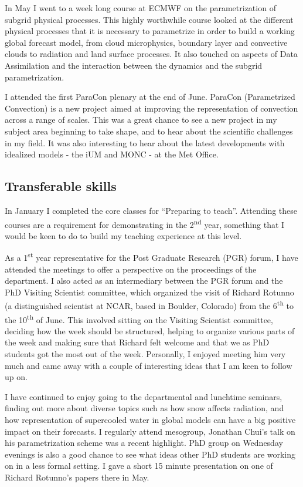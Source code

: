 \documentclass[11pt,a4paper]{article}
\newcommand{\ts}{\textsuperscript}
\begin{document}
In May I went to a week long course at ECMWF on the parametrization of subgrid physical processes.
This highly worthwhile course looked at the different physical processes that it is necessary to
parametrize in order to build a working global forecast model, from cloud microphysics, boundary
layer and convective clouds to radiation and land surface processes. It also touched on aspects of
Data Assimilation and the interaction between the dynamics and the subgrid parametrization.

I attended the first ParaCon plenary at the end of June. ParaCon (Parametrized Convection) is a new
project aimed at improving the representation of convection across a range of scales. This was a
great chance to see a new project in my subject area beginning to take shape, and to hear about the
scientific challenges in my field. It was also interesting to hear about the latest developments
with idealized models - the iUM and MONC - at the Met Office.

\label{sec:Training record}
\subsection{Transferable skills}
In January I completed the core classes for ``Preparing to teach''. Attending these courses are a
requirement for demonstrating in the 2\ts{nd} year, something that I would be keen to do to 
build my teaching experience at this level.

As a 1\ts{st} year representative for the Post Graduate Research (PGR) forum, I have attended the
meetings to offer a perspective on the proceedings of the department. I also acted as an
intermediary between the PGR forum and the PhD Visiting Scientist committee, which organized the
visit of Richard Rotunno (a distinguished scientist at NCAR, based in Boulder, Colorado) from the
6\ts{th} to the 10\ts{th} of June. This involved sitting on the Visiting Scientist committee,
deciding how the week should be structured, helping to organize various parts of the week and making
sure that Richard felt welcome and that we as PhD students got the most out of the week. Personally,
I enjoyed meeting him very much and came away with a couple of interesting ideas that I am keen to
follow up on.

I have continued to enjoy going to the departmental and lunchtime seminars, finding out more about
diverse topics such as how snow affects radiation, and how representation of supercooled water in
global models can have a big positive impact on their forecasts. I regularly attend mesogroup,
Jonathan Chui's talk on his parametrization scheme was a recent highlight. PhD group on Wednesday
evenings is also a good chance to see what ideas other PhD students are working on in a less formal
setting. I gave a short 15 minute presentation on one of Richard Rotunno's papers there in May.
\end{document}
